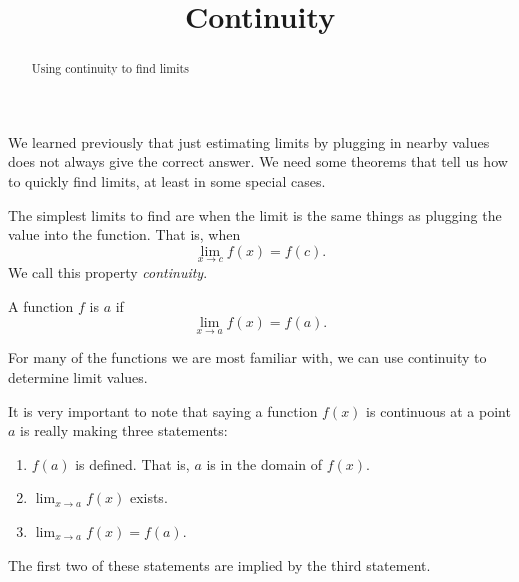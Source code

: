 \documentclass{ximera}
\title[Dig-In:]{Continuity}
\begin{document}
\begin{abstract}
Using continuity to find limits
\end{abstract}
\maketitle


We learned previously that just estimating limits by plugging in nearby values
does not always give the correct answer.  We need some theorems that
tell us how to quickly find limits, at least in some special cases.  

The simplest limits to find are when the limit is the same things as plugging the value into the function. That is, when
\[
\lim_{x\to c}f(x) = f(c).
\]
We call this property \textit{continuity}.

\begin{definition}
  A function $f$ is  $a$ if
  \[
  \lim_{x\to a}f(x) = f(a).
  \]
\end{definition}

For many of the functions we are most familiar with, we can use continuity to determine limit values.  

It is very important to note that saying a function $f(x)$ is continuous at a point
$a$ is really making three statements:
\begin{enumerate}
\item $f(a)$ is defined.  That is, $a$ is in the domain of $f(x)$.
\item $\lim_{x\to a}f(x)$ exists.
\item $\lim_{x\to a} f(x) = f(a)$.
\end{enumerate}

The first two of these statements are implied by the third statement.
\end{document}
